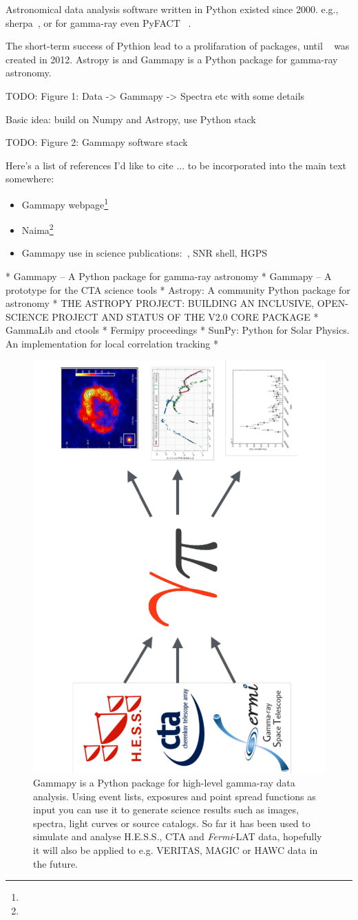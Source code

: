 Astronomical data analysis software written in Python existed since 2000. e.g.,
sherpa~\citep{sherpa-2011, sherpa-2009}, or for gamma-ray even PyFACT
~\citep{pyfact}.

The short-term success of Pythion lead to a prolifaration of packages, until
\astropy~\citep{astropy} was created in 2012. Astropy is and Gammapy is a
Python package for gamma-ray astronomy.



TODO: Figure 1: Data -> Gammapy -> Spectra etc with some details

Basic idea: build on Numpy and Astropy, use Python stack

TODO: Figure 2: Gammapy software stack

Here's a list of references I'd like to cite ... to be incorporated into the
main text somewhere:

\begin{itemize}
	\item Gammapy webpage\footnote{\GammapyUrl}
	\item Naima\footnote{\NaimaUrl}~\citep{Naima}
	\item Gammapy use in science publications:~\citep{Owen2015}, SNR shell, HGPS
\end{itemize}

* Gammapy – A Python package for gamma-ray astronomy
* Gammapy – A prototype for the CTA science tools
* Astropy: A community Python package for astronomy
* THE ASTROPY PROJECT: BUILDING AN INCLUSIVE, OPEN-SCIENCE PROJECT AND STATUS
OF THE V2.0 CORE PACKAGE * GammaLib and ctools * Fermipy proceedings * SunPy:
Python for Solar Physics. An implementation for local correlation tracking *

\begin{figure}[t]
	\centering
	\includegraphics[height=0.5\textwidth,
		angle=270]{static/gammapy-big-picture} \caption{ Gammapy is a Python package
		for high-level gamma-ray data analysis. Using event lists, exposures and point
		spread functions as input you can use it to generate science results such as
		images, spectra, light curves or source catalogs. So far it has been used to
		simulate and analyse H.E.S.S., CTA and \textit{Fermi}-LAT data, hopefully it
		will also be applied to e.g. VERITAS, MAGIC or HAWC data in the future. }
	\label{fig:big-picture}

\end{figure}

